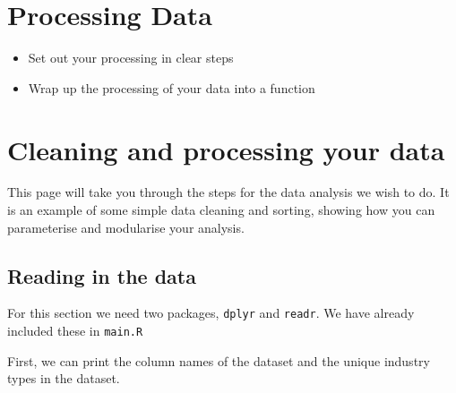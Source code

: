 \documentclass[
  letterpaper,
]{book}
\begin{document}

\hypertarget{sec-process}{%
\chapter{Processing Data}\label{sec-process}}

\begin{tcolorbox}[enhanced jigsaw, toprule=.15mm, left=2mm, colback=white, breakable, title=\textcolor{quarto-callout-note-color}{\faInfo}\hspace{0.5em}{Key Points}, colframe=quarto-callout-note-color-frame, opacitybacktitle=0.6, coltitle=black, titlerule=0mm, bottomrule=.15mm, rightrule=.15mm, bottomtitle=1mm, toptitle=1mm, arc=.35mm, leftrule=.75mm, opacityback=0, colbacktitle=quarto-callout-note-color!10!white]

\begin{itemize}
\item
  Set out your processing in clear steps
\item
  Wrap up the processing of your data into a function
\end{itemize}

\end{tcolorbox}


\hypertarget{cleaning-and-processing-your-data}{%
\chapter{Cleaning and processing your
data}\label{cleaning-and-processing-your-data}}

This page will take you through the steps for the data analysis we wish
to do. It is an example of some simple data cleaning and sorting,
showing how you can parameterise and modularise your analysis.

\hypertarget{reading-in-the-data}{%
\section{Reading in the data}\label{reading-in-the-data}}

For this section we need two packages, \texttt{dplyr} and
\texttt{readr}. We have already included these in \texttt{main.R}

First, we can print the column names of the dataset and the unique
industry types in the dataset.
\end{document}
